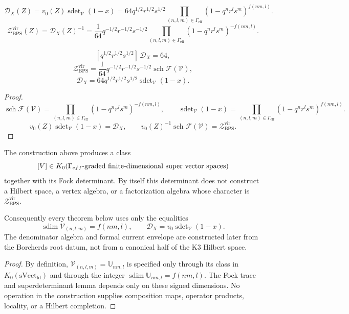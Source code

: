 \documentclass[11pt]{memoir}
\newcommand{\sdim}{\operatorname{sdim}}
\newcommand{\sch}{\operatorname{sch}}
\newcommand{\sdet}{\operatorname{sdet}}
\begin{document}
\begin{definition}
$$\mathcal{D}_X(Z)
=v_0(Z)\sdet_{\mathcal V}(1-x)
=64q^{1/2}r^{1/2}s^{1/2}
\prod_{(n,l,m)\in\Gamma_{\mathrm{eff}}}
(1-q^nr^ls^m)^{f(nm,l)}.$$
$$\mathcal Z_{\mathrm{BPS}}^{\mathrm{vir}}(Z)
=\mathcal D_X(Z)^{-1}
=\frac{1}{64}q^{-1/2}r^{-1/2}s^{-1/2}
\prod_{(n,l,m)\in\Gamma_{\mathrm{eff}}}
(1-q^nr^ls^m)^{-f(nm,l)}.$$
\end{definition}

\begin{proposition}
$$[q^{1/2}r^{1/2}s^{1/2}]\,\mathcal D_X=64,$$
$$\mathcal Z_{\mathrm{BPS}}^{\mathrm{vir}}
=\frac{1}{64}q^{-1/2}r^{-1/2}s^{-1/2}\sch\mathcal F(\mathcal V),$$
$$\mathcal D_X
=64q^{1/2}r^{1/2}s^{1/2}\sdet_{\mathcal V}(1-x).$$
\end{proposition}

\begin{proof}
$$\sch\mathcal F(\mathcal V)
=\prod_{(n,l,m)\in\Gamma_{\mathrm{eff}}}
(1-q^nr^ls^m)^{-f(nm,l)},\qquad
\sdet_{\mathcal V}(1-x)
=\prod_{(n,l,m)\in\Gamma_{\mathrm{eff}}}
(1-q^nr^ls^m)^{f(nm,l)}.$$
$$v_0(Z)\sdet_{\mathcal V}(1-x)=\mathcal D_X,\qquad
v_0(Z)^{-1}\sch\mathcal F(\mathcal V)
=\mathcal Z_{\mathrm{BPS}}^{\mathrm{vir}}.$$
\end{proof}

\begin{theorem}
The construction above produces a class
$$
[\mathcal V]\in
K_0(\Gamma_{\mathrm{eff}}\hbox{-graded finite-dimensional super vector spaces})
$$
together with its Fock determinant.  By itself this determinant does not
construct a Hilbert space, a vertex algebra, or a factorization algebra
whose character is $\mathcal Z_{\mathrm{BPS}}^{\mathrm{vir}}$.

Consequently every theorem below uses only the equalities
$$\sdim\mathcal V_{(n,l,m)}=f(nm,l),\qquad
\mathcal D_X=v_0\sdet_{\mathcal V}(1-x).$$
The denominator algebra and formal current envelope are constructed
later from the Borcherds root datum, not from a canonical half of the K3
Hilbert space.
\end{theorem}

\begin{proof}
By definition, $\mathcal V_{(n,l,m)}=\mathbb U_{nm,l}$ is specified only
through its class in $K_0(\mathrm{sVect}_{\mathrm{fd}})$ and through the
integer $\sdim\mathbb U_{nm,l}=f(nm,l)$.  The Fock trace and
superdeterminant lemma depends only on these signed dimensions.  No
operation in the construction supplies composition maps, operator
products, locality, or a Hilbert completion.
\end{proof}
\end{document}
